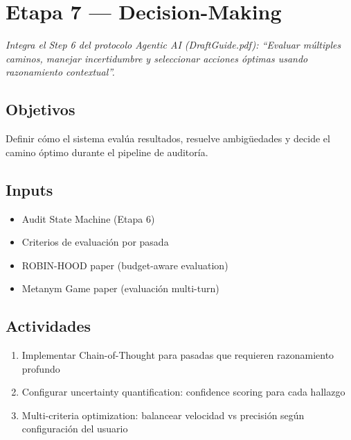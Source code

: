\documentclass[12pt,a4paper]{article}
\begin{document}
\section{Etapa 7 --- Decision-Making}

\emph{Integra el Step 6 del protocolo Agentic AI (DraftGuide.pdf): ``Evaluar múltiples caminos, manejar incertidumbre y seleccionar acciones óptimas usando razonamiento contextual''.}

\subsection*{Objetivos}
Definir cómo el sistema evalúa resultados, resuelve ambigüedades y decide el camino óptimo durante el pipeline de auditoría.

\subsection*{Inputs}
\begin{itemize}
  \item Audit State Machine (Etapa 6)
  \item Criterios de evaluación por pasada
  \item ROBIN-HOOD paper (budget-aware evaluation)
  \item Metanym Game paper (evaluación multi-turn)
\end{itemize}

\subsection*{Actividades}
\begin{enumerate}
  \item Implementar Chain-of-Thought para pasadas que requieren razonamiento profundo
  \item Configurar uncertainty quantification: confidence scoring para cada hallazgo
  \item Multi-criteria optimization: balancear velocidad vs precisión según configuración del usuario
\end{enumerate}
\end{document}
